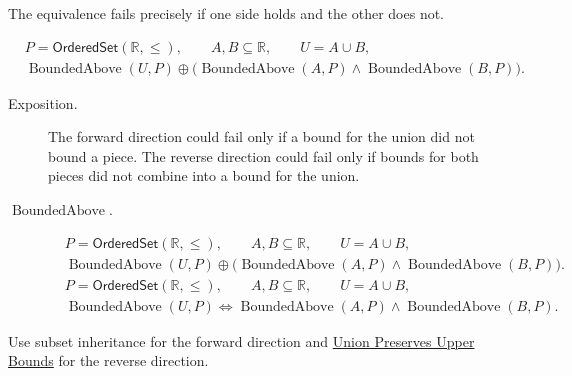 \begin{remark*}
The equivalence fails precisely if one side holds and the other does not.
\end{remark*}

\begin{remark*}
\[
\begin{aligned}
&P=\mathsf{OrderedSet}(\mathbb{R},\leq),\qquad A,B\subseteq\mathbb{R},\qquad U=A\cup B,\\
&\operatorname{BoundedAbove}(U,P)\oplus
\bigl(\operatorname{BoundedAbove}(A,P)\land\operatorname{BoundedAbove}(B,P)\bigr).
\end{aligned}
\]
\end{remark*}

\begin{remark*}
\begin{description}
\item[Exposition.]
The forward direction could fail only if a bound for the union did not bound a
piece.  The reverse direction could fail only if bounds for both pieces did not
combine into a bound for the union.


  \item[\(\operatorname{BoundedAbove}.\)]

\[
\begin{aligned}
&P=\mathsf{OrderedSet}(\mathbb{R},\leq),\qquad A,B\subseteq\mathbb{R},\qquad U=A\cup B,\\
&\operatorname{BoundedAbove}(U,P)\oplus
\bigl(\operatorname{BoundedAbove}(A,P)\land\operatorname{BoundedAbove}(B,P)\bigr).
\end{aligned}
\]
\[
\begin{aligned}
&P=\mathsf{OrderedSet}(\mathbb{R},\leq),\qquad A,B\subseteq\mathbb{R},\qquad U=A\cup B,\\
&\operatorname{BoundedAbove}(U,P)
\Longleftrightarrow
\operatorname{BoundedAbove}(A,P)\land\operatorname{BoundedAbove}(B,P).
\end{aligned}
\]
\end{description}
\end{remark*}

\begin{remark*}[Interpretation]
Use subset inheritance for the forward direction and
\hyperref[lem:union-preserves-upper-bounds]{Union Preserves Upper Bounds} for
the reverse direction.
\end{remark*}

